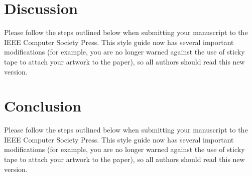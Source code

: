 \documentclass[10pt,twocolumn,letterpaper]{article}
\begin{document}



\section{Discussion}
\label{sec:discussion}

Please follow the steps outlined below when submitting your manuscript to the IEEE Computer Society Press.
This style guide now has several important modifications (for example, you are no longer warned against the use of sticky tape to attach your artwork to the paper), so all authors should read this new version.



\section{Conclusion}
\label{sec:conclusion}

Please follow the steps outlined below when submitting your manuscript to the IEEE Computer Society Press.
This style guide now has several important modifications (for example, you are no longer warned against the use of sticky tape to attach your artwork to the paper), so all authors should read this new version.

\end{document}
